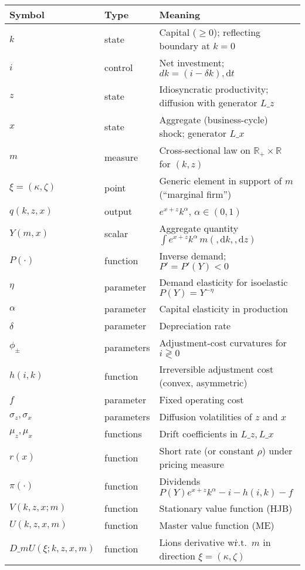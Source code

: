 \documentclass[11pt,letterpaper,oneside]{article}
\numberwithin{equation}{section}
\newcommand{\R}{\mathbb{R}}
\newcommand{\1}{\mathbf{1}}
\newcommand{\diff}{,\mathrm{d}}
\newcommand{\Lz}{L\_z}
\newcommand{\Lx}{L\_x}
\newcommand{\dmU}{D\_m U}
\begin{document}
\begin{table}[ht]
\centering
\small
\begin{tabular}{@{} l l p{}}
\toprule
\textbf{Symbol} & \textbf{Type} & \textbf{Meaning} \\
\midrule
$k$ & state & Capital ($\ge 0$); reflecting boundary at $k=0$ \\
$i$ & control & Net investment; $dk=(i-\delta k)\diff t$ \\
$z$ & state & Idiosyncratic productivity; diffusion with generator $\Lz$ \\
$x$ & state & Aggregate (business-cycle) shock; generator $\Lx$ \\
$m$ & measure & Cross-sectional law on $\R_+\times\R$ for $(k,z)$ \\
$\xi=(\kappa,\zeta)$ & point & Generic element in support of $m$ (``marginal firm'') \\
$q(k,z,x)$ & output & $e^{x+z}k^\alpha$, $\alpha\in(0,1)$ \\
$Y(m,x)$ & scalar & Aggregate quantity $\int e^{x+z}k^\alpha\,m(\diff k,\diff z)$ \\
$P(\cdot)$ & function & Inverse demand; $P'=P'(Y)<0$ \\
$\eta$ & parameter & Demand elasticity for isoelastic $P(Y)=Y^{-\eta}$ \\
$\alpha$ & parameter & Capital elasticity in production \\
$\delta$ & parameter & Depreciation rate \\
$\phi_\pm$ & parameters & Adjustment-cost curvatures for $i\gtrless 0$ \\
$h(i,k)$ & function & Irreversible adjustment cost (convex, asymmetric) \\
$f$ & parameter & Fixed operating cost \\
$\sigma_z,\sigma_x$ & parameters & Diffusion volatilities of $z$ and $x$ \\
$\mu_z,\mu_x$ & functions & Drift coefficients in $\Lz,\Lx$ \\
$r(x)$ & function & Short rate (or constant $\rho$) under pricing measure \\
$\pi(\cdot)$ & function & Dividends $P(Y)e^{x+z}k^\alpha - i - h(i,k) - f$ \\
$V(k,z,x;m)$ & function & Stationary value function (HJB) \\
$U(k,z,x,m)$ & function & Master value function (ME) \\
$\dmU(\xi;k,z,x,m)$ & function & Lions derivative w\.r.t.\ $m$ in direction $\xi=(\kappa,\zeta)$ \\

\end{tabular}
\end{table}
\end{document}

